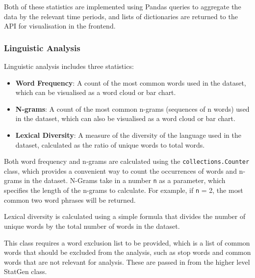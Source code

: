 \documentclass[12pt, a4paper]{article}
\begin{document}
Both of these statistics are implemented using Pandas queries to aggregate the data by the relevant time periods, and lists of dictionaries are returned to the API for visualisation in the frontend.

\subsubsection{Linguistic Analysis}
Linguistic analysis includes three statistics:
\begin{itemize}
    \item \textbf{Word Frequency}: A count of the most common words used in the dataset, which can be visualised as a word cloud or bar chart.
    \item \textbf{N-grams}: A count of the most common n-grams (sequences of n words) used in the dataset, which can also be visualised as a word cloud or bar chart.
    \item \textbf{Lexical Diversity}: A measure of the diversity of the language used in the dataset, calculated as the ratio of unique words to total words.
\end{itemize}

Both word frequency and n-grams are calculated using the \texttt{collections.Counter} class, which provides a convenient way to count the occurrences of words and n-grams in the dataset. N-Grams take in a number \texttt{n} as a parameter, which specifies the length of the n-grams to calculate. For example, if \texttt{n} = 2, the most common two word phrases will be returned.

Lexical diversity is calculated using a simple formula that divides the number of unique words by the total number of words in the dataset.

This class requires a word exclusion list to be provided, which is a list of common words that should be excluded from the analysis, such as stop words and common words that are not relevant for analysis. These are passed in from the higher level StatGen class.
\end{document}
